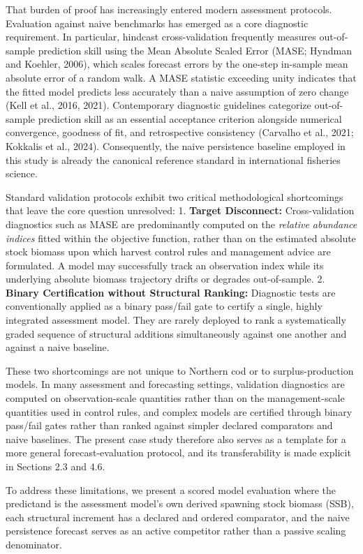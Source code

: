 \documentclass[11pt]{article}
\begin{document}
That burden of proof has increasingly entered modern assessment
protocols. Evaluation against naive benchmarks has emerged as a core
diagnostic requirement. In particular, hindcast cross-validation
frequently measures out-of-sample prediction skill using the Mean
Absolute Scaled Error (MASE; Hyndman and Koehler, 2006), which scales
forecast errors by the one-step in-sample mean absolute error of a
random walk. A MASE statistic exceeding unity indicates that the fitted
model predicts less accurately than a naive assumption of zero change
(Kell et al., 2016, 2021). Contemporary diagnostic guidelines categorize
out-of-sample prediction skill as an essential acceptance criterion
alongside numerical convergence, goodness of fit, and retrospective
consistency (Carvalho et al., 2021; Kokkalis et al., 2024).
Consequently, the naive persistence baseline employed in this study is
already the canonical reference standard in international fisheries
science.

Standard validation protocols exhibit two critical methodological
shortcomings that leave the core question unresolved: 1. \textbf{Target
Disconnect:} Cross-validation diagnostics such as MASE are predominantly
computed on the \emph{relative abundance indices} fitted within the
objective function, rather than on the estimated absolute stock biomass
upon which harvest control rules and management advice are formulated. A
model may successfully track an observation index while its underlying
absolute biomass trajectory drifts or degrades out-of-sample. 2.
\textbf{Binary Certification without Structural Ranking:} Diagnostic
tests are conventionally applied as a binary pass/fail gate to certify a
single, highly integrated assessment model. They are rarely deployed to
rank a systematically graded sequence of structural additions
simultaneously against one another and against a naive baseline.

These two shortcomings are not unique to Northern cod or to
surplus-production models. In many assessment and forecasting settings,
validation diagnostics are computed on observation-scale quantities
rather than on the management-scale quantities used in control rules,
and complex models are certified through binary pass/fail gates rather
than ranked against simpler declared comparators and naive baselines.
The present case study therefore also serves as a template for a more
general forecast-evaluation protocol, and its transferability is made
explicit in Sections 2.3 and 4.6.

To address these limitations, we present a scored model evaluation where
the predictand is the assessment model's own derived spawning stock
biomass (SSB), each structural increment has a declared and ordered
comparator, and the naive persistence forecast serves as an active
competitor rather than a passive scaling denominator.
\end{document}
